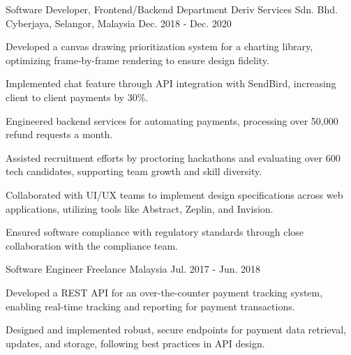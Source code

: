 \begin{cventries}
  \cventry
    {Software Developer, Frontend/Backend Department} %
    {Deriv Services Sdn. Bhd.} %
    {Cyberjaya, Selangor, Malaysia} %
    {Dec. 2018 - Dec. 2020} %
    {
      \begin{cvitems} %
        \item {Developed a canvas drawing prioritization system for a charting library, optimizing frame-by-frame rendering to ensure design fidelity.}
        \item {Implemented chat feature through API integration with SendBird, increasing client to client payments by 30\%.}
        \item {Engineered backend services for automating payments, processing over 50,000 refund requests a month.}
        \item {Assisted recruitment efforts by proctoring hackathons and evaluating over 600 tech candidates, supporting team growth and skill diversity.}
        \item {Collaborated with UI/UX teams to implement design specifications across web applications, utilizing tools like Abstract, Zeplin, and Invision.}
        \item {Ensured software compliance with regulatory standards through close collaboration with the compliance team.}
      \end{cvitems}
    }

  \cventry
    {Software Engineer} %
    {Freelance} %
    {Malaysia} %
    {Jul. 2017 - Jun. 2018} %
    {
      \begin{cvitems} %
        \item {Developed a REST API for an over-the-counter payment tracking system, enabling real-time tracking and reporting for payment transactions.}
        \item {Designed and implemented robust, secure endpoints for payment data retrieval, updates, and storage, following best practices in API design.}
      \end{cvitems}
    }
\end{cventries}
